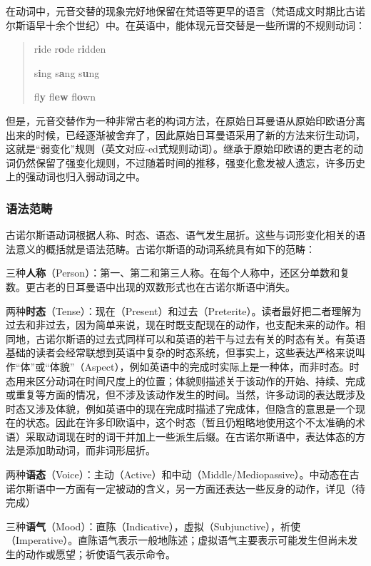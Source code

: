 在动词中，元音交替的现象完好地保留在梵语等更早的语言（梵语成文时期比古诺尔斯语早十余个世纪）中。在英语中，能体现元音交替是一些所谓的不规则动词：

\begin{quote}
    r\textbf{i}de r\textbf{o}de r\textbf{i}dden

    s\textbf{i}ng s\textbf{a}ng s\textbf{u}ng

    fl\textbf{y} fl\textbf{ew} fl\textbf{o}wn
\end{quote}

但是，元音交替作为一种非常古老的构词方法，在原始日耳曼语从原始印欧语分离出来的时候，已经逐渐被舍弃了，因此原始日耳曼语采用了新的方法来衍生动词，这就是“弱变化”规则（英文对应-ed式规则动词）。继承于原始印欧语的更古老的动词仍然保留了强变化规则，不过随着时间的推移，强变化愈发被人遗忘，许多历史上的强动词也归入弱动词之中。

\subsubsection*{语法范畴}
古诺尔斯语动词根据人称、时态、语态、语气发生屈折。这些与词形变化相关的语法意义的概括就是语法范畴。古诺尔斯语的动词系统具有如下的范畴：

三种\textbf{人称}（Person）：第一、第二和第三人称。在每个人称中，还区分单数和复数。更古老的日耳曼语中出现的双数形式也在古诺尔斯语中消失。

两种\textbf{时态}（Tense）：现在（Present）和过去（Preterite）。读者最好把二者理解为过去和非过去，因为简单来说，现在时既支配现在的动作，也支配未来的动作。相同地，古诺尔斯语的过去式同样可以和英语的若干与过去有关的时态有关。有英语基础的读者会经常联想到英语中复杂的时态系统，但事实上，这些表达严格来说叫作``体''或``体貌''（Aspect），例如英语中的完成时实际上是一种体，而非时态。时态用来区分动词在时间尺度上的位置；体貌则描述关于该动作的开始、持续、完成或重复等方面的情况，但不涉及该动作发生的时间。当然，许多动词的表达既涉及时态又涉及体貌，例如英语中的现在完成时描述了完成体，但隐含的意思是一个现在的状态。因此在许多印欧语中，这个时态（暂且仍粗略地使用这个不太准确的术语）采取动词现在时的词干并加上一些派生后缀。在古诺尔斯语中，表达体态的方法是添加助动词，而非词形屈折。

两种\textbf{语态}（Voice）：主动（Active）和中动（Middle/Mediopassive）。中动态在古诺尔斯语中一方面有一定被动的含义，另一方面还表达一些反身的动作，详见（待完成）

三种\textbf{语气}（Mood）：直陈（Indicative），虚拟（Subjunctive），祈使（Imperative）。直陈语气表示一般地陈述；虚拟语气主要表示可能发生但尚未发生的动作或愿望；祈使语气表示命令。

